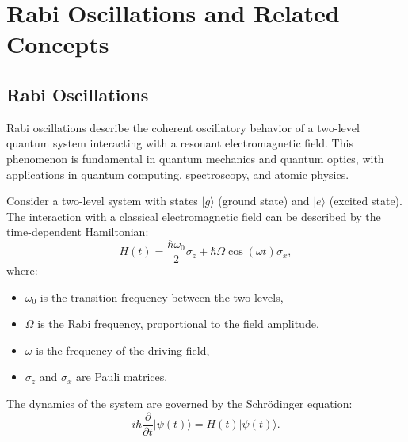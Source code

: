 
\chapter{Rabi Oscillations and Related Concepts} %

\label{ChapterRabiOscillations} %


\section{Rabi Oscillations}

Rabi oscillations describe the coherent oscillatory behavior of a two-level quantum system interacting with a resonant electromagnetic field. This phenomenon is fundamental in quantum mechanics and quantum optics, with applications in quantum computing, spectroscopy, and atomic physics.

Consider a two-level system with states \(|g\rangle\) (ground state) and \(|e\rangle\) (excited state). The interaction with a classical electromagnetic field can be described by the time-dependent Hamiltonian:
\begin{equation}
    H(t) = \frac{\hbar \omega_0}{2} \sigma_z + \hbar \Omega \cos(\omega t) \sigma_x,
    \label{eq:RabiHamiltonian}
\end{equation}
where:
\begin{itemize}
    \item \(\omega_0\) is the transition frequency between the two levels,
    \item \(\Omega\) is the Rabi frequency, proportional to the field amplitude,
    \item \(\omega\) is the frequency of the driving field,
    \item \(\sigma_z\) and \(\sigma_x\) are Pauli matrices.
\end{itemize}

The dynamics of the system are governed by the Schrödinger equation:
\begin{equation}
    i\hbar \frac{\partial}{\partial t} |\psi(t)\rangle = H(t) |\psi(t)\rangle.
    \label{eq:Schrodinger}
\end{equation}

